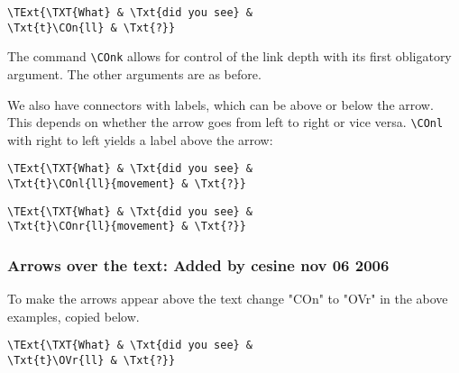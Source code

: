\documentclass[12pt,a4paper]{article}
\begin{document}
\begin{minipage}[t]{5cm}
\end{minipage}
\begin{minipage}[t]{9cm}
\begin{verbatim}
\TExt{\TXT{What} & \Txt{did you see} &
\Txt{t}\COn{ll} & \Txt{?}}
\end{verbatim}
\end{minipage}

The command \verb|\COnk| allows for control of the link depth with its first
obligatory argument. The other arguments are as before.

We also have connectors with labels, which can be above or below the arrow. This
depends on whether the arrow goes from left to right or vice versa. \verb|\COnl|
with right to left yields a label above the arrow:

\begin{minipage}[t]{5cm}
\end{minipage}
\begin{minipage}[t]{9cm}
\begin{verbatim}
\TExt{\TXT{What} & \Txt{did you see} &
\Txt{t}\COnl{ll}{movement} & \Txt{?}}
\end{verbatim}
\end{minipage}

\begin{minipage}[t]{5cm}
\end{minipage}
\begin{minipage}[t]{9cm}
\begin{verbatim}
\TExt{\TXT{What} & \Txt{did you see} &
\Txt{t}\COnr{ll}{movement} & \Txt{?}}
\end{verbatim}
\end{minipage}

\subsubsection{Arrows over the text:  Added by cesine nov 06 2006}
To make the arrows appear above the text change "COn" to "OVr" in the above examples, copied below.


\begin{minipage}[t]{5cm}
\end{minipage}
\begin{minipage}[t]{9cm}
\begin{verbatim}
\TExt{\TXT{What} & \Txt{did you see} &
\Txt{t}\OVr{ll} & \Txt{?}}
\end{verbatim}
\end{minipage}
\end{document}
